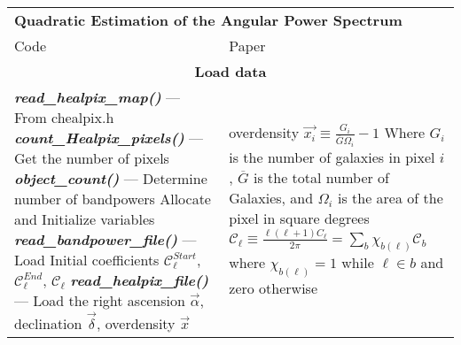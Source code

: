 \documentclass{article}
\newcommand{\func}[1] {\textbf{\textit{#1()}}}
\begin{document}
\begin{spacing}{2}
\setlength\LTleft{0pt}
\setlength\LTright{0pt}
\begin{longtable}{@{\extracolsep{\fill}}p{}
                                         p{}@{}}
\multicolumn{2}{l}{\bf Quadratic Estimation of the Angular Power Spectrum} \\
Code & Paper  \\
\hline
\multicolumn{2}{c}{\bf Load data} \\ \hline
\func{read\_healpix\_map} \newline
--- From chealpix.h \newline
\func{count\_Healpix\_pixels} \newline
--- Get the number of pixels \newline
\func{object\_count} \newline
--- Determine number of bandpowers \newline
Allocate and Initialize variables \newline
\func{read\_bandpower\_file} \newline
--- Load Initial coefficients $\mathcal{C}^{Start}_{\ell}$, $\mathcal{C}^{End}_{\ell}$, $\mathcal{C}_{\ell}$ \newline
\func{read\_healpix\_file} \newline
--- Load the right ascension $\vec{\alpha}$, declination $\vec{\delta}$, overdensity $\vec{x}$\newline
& %
overdensity
$\vec{x_i} \equiv \frac{G_i}{\overline{G}\Omega_i} - 1$ \newline 
Where $G_i$ is the number of galaxies in pixel $i$, $\overline{G}$ is the total number of Galaxies, and $\Omega_i$ is the area of the pixel in square degrees \newline 
\newline
$\mathcal{C}_\ell \equiv \frac{\ell(\ell+1)C_{\ell}}{2\pi} = \sum_{b} \chi_{b(\ell)} \mathcal{C}_b$ \newline \newline
where $\chi_{b(\ell)} = 1$ while $\ell \in b$ and zero otherwise 
\\ %



\end{longtable}
\end{spacing}
\end{document}

